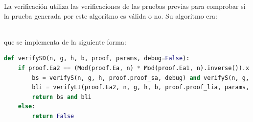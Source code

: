 La verificación utiliza las verificaciones de las pruebas previas para comprobar si la prueba generada por este algoritmo es válida o no. Su algoritmo era: \\
\begin{minipage}{0.9\textwidth}
    \begin{algorithm}[H]
        \caption{Prueba con tolerancia: $\operatorname{Verify_{WT}}$}
    \end{algorithm}
\end{minipage} \\
que se implementa de la siguiente forma:
\begin{lstlisting}[language=Python, basicstyle=\footnotesize]
def verifySD(n, g, h, b, proof, params, debug=False):
    if proof.Ea2 == (Mod(proof.Ea, n) * Mod(proof.Ea1, n).inverse()).x and proof.Eb2 == (Mod(proof.Eb, n) * Mod(proof.Eb1, n).inverse()).x:
        bs = verifyS(n, g, h, proof.proof_sa, debug) and verifyS(n, g, h, proof.proof_sb, debug)
        bli = verifyLI(proof.Ea2, n, g, h, b, proof.proof_lia, params, debug) and verifyLI(proof.Eb2, n, g, h, b, proof.proof_lib, params, debug)
        return bs and bli
    else:
        return False
\end{lstlisting}

